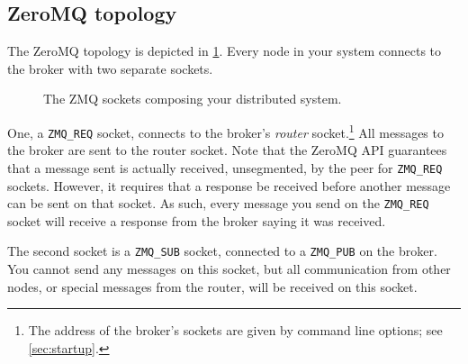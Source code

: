 \documentclass[12pt]{article}
\begin{document}
\subsection{ZeroMQ topology}

The ZeroMQ topology is depicted in \cref{fig:broker_topology}. Every node in your system connects to the broker with two separate sockets.

\begin{figure}
\centering
{}
\caption{The ZMQ sockets composing your distributed system.}
\label{fig:broker_topology}
\end{figure}

One, a {\tt ZMQ\_REQ} socket, connects to the broker's {\em router} socket.\footnote{The address of the broker's sockets are given by command line options; see \cref{sec:startup}.} All messages to the broker are sent to the router socket. Note that the ZeroMQ API guarantees that a message sent is actually received, unsegmented, by the peer for {\tt ZMQ\_REQ} sockets. However, it requires that a response be received before another message can be sent on that socket. As such, every message you send on the {\tt ZMQ\_REQ} socket will receive a response from the broker saying it was received.

The second socket is a {\tt ZMQ\_SUB} socket, connected to a {\tt ZMQ\_PUB} on the broker. You cannot send any messages on this socket, but all communication from other nodes, or special messages from the router, will be received on this socket.
\end{document}
